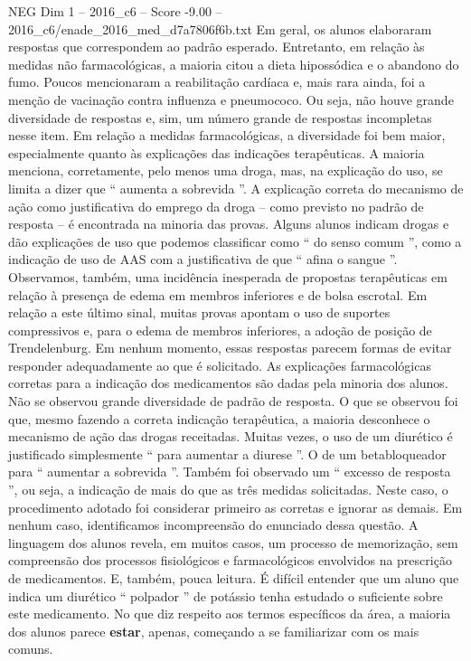 \begin{textsample}{NEG Dim 1 – 2016\_c6 – Score -9.00 – 2016\_c6/enade\_2016\_med\_d7a7806f6b.txt}
Em geral, os alunos elaboraram respostas que correspondem ao padrão esperado.
Entretanto, em relação às medidas não farmacológicas, a maioria citou a dieta hipossódica e o abandono do fumo.
Poucos mencionaram a reabilitação cardíaca e, mais rara ainda, foi a menção de vacinação contra influenza e pneumococo.
Ou seja, não houve grande diversidade de respostas e, sim, um número grande de respostas incompletas nesse item.
Em relação a medidas farmacológicas, a diversidade foi bem maior, especialmente quanto às explicações das indicações terapêuticas.
A maioria menciona, corretamente, pelo menos uma droga, mas, na explicação do uso, se limita a dizer que “ aumenta a sobrevida ”.
A explicação correta do mecanismo de ação como justificativa do emprego da droga – como previsto no padrão de resposta – é encontrada na minoria das provas.
Alguns alunos indicam drogas e dão explicações de uso que podemos classificar como “ do senso comum ”, como a indicação de uso de AAS com a justificativa de que “ afina o sangue ”.
Observamos, também, uma incidência inesperada de propostas terapêuticas em relação à presença de edema em membros inferiores e de bolsa escrotal.
Em relação a este último sinal, muitas provas apontam o uso de suportes compressivos e, para o edema de membros inferiores, a adoção de posição de Trendelenburg.
Em nenhum momento, essas respostas parecem formas de evitar responder adequadamente ao que é solicitado.
As explicações farmacológicas corretas para a indicação dos medicamentos são dadas pela minoria dos alunos.
Não se observou grande diversidade de padrão de resposta.
O que se observou foi que, mesmo fazendo a correta indicação terapêutica, a maioria desconhece o mecanismo de ação das drogas receitadas.
Muitas vezes, o uso de um diurético é justificado simplesmente “ para aumentar a diurese ”.
O de um betabloqueador para “ aumentar a sobrevida ”.
Também foi observado um “ excesso de resposta ”, ou seja, a indicação de mais do que as três medidas solicitadas.
Neste caso, o procedimento adotado foi considerar primeiro as corretas e ignorar as demais.
Em nenhum caso, identificamos incompreensão do enunciado dessa questão.
A linguagem dos alunos revela, em muitos casos, um processo de memorização, sem compreensão dos processos fisiológicos e farmacológicos envolvidos na prescrição de medicamentos.
E, também, pouca leitura.
É difícil entender que um aluno que indica um diurético “ polpador ” de potássio tenha estudado o suficiente sobre este medicamento.
No que diz respeito aos termos específicos da área, a maioria dos alunos parece \textbf{estar}, apenas, começando a se familiarizar com os mais comuns.

\end{textsample}

